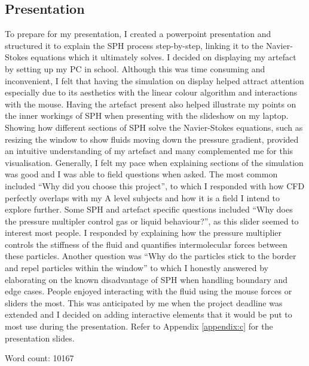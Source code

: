 \documentclass[write-up.tex]{subfiles}
\begin{document}
 \subsection{Presentation}

 To prepare for my presentation, I created a powerpoint presentation and structured it to explain the SPH process step-by-step, linking it to the Navier-Stokes equations which it ultimately solves. I decided on displaying my artefact by setting up my PC in school. Although this was time consuming and inconvenient, I felt that having the simulation on display helped attract attention especially due to its aesthetics with the linear colour algorithm and interactions with the mouse. Having the artefact present also helped illustrate my points on the inner workings of SPH when presenting with the slideshow on my laptop. Showing how different sections of SPH solve the Navier-Stokes equations, such as resizing the window to show fluids moving down the pressure gradient, provided an intuitive understanding of my artefact and many complemented me for this visualisation. Generally, I felt my pace when explaining sections of the simulation was good and I was able to field questions when asked. The most common included ``Why did you choose this project'', to which I responded with how CFD perfectly overlaps with my A level subjects and how it is a field I intend to explore further. Some SPH and artefact specific questions included ``Why does the pressure multipler control gas or liquid behaviour?'', as this slider seemed to interest most people. I responded by explaining how the pressure multiplier controls the stiffness of the fluid and quantifies intermolecular forces between these particles. Another question was ``Why do the particles stick to the border and repel particles within the window'' to which I honestly answered by elaborating on the known disadvantage of SPH when handling boundary and edge cases. People enjoyed interacting with the fluid using the mouse forces or sliders the most. This was anticipated by me when the project deadline was extended and I decided on adding interactive elements that it would be put to most use during the presentation. Refer to Appendix \ref{appendix:c} for the presentation slides.





Word count: 10167
 
\end{document}
